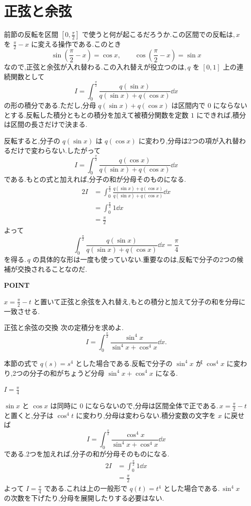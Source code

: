 \section{正弦と余弦}\label{節:正弦余弦の交換}

前節の反転を区間 $\left[0,\frac{\pi}{2}\right]$ で使うと何が起こるだろうか.この区間での反転は,\,$x$ を $\frac{\pi}{2}-x$ に変える操作である.このとき
\[
\sin\left(\frac{\pi}{2}-x\right)=\cos x,\qquad
\cos\left(\frac{\pi}{2}-x\right)=\sin x
\]
なので,正弦と余弦が入れ替わる.この入れ替えが役立つのは,\,$q$ を $[0,1]$ 上の連続関数として
\[
I=\int_0^{\frac{\pi}{2}}
\frac{q(\sin x)}{q(\sin x)+q(\cos x)}\dd x
\]
の形の積分である.ただし,分母 $q(\sin x)+q(\cos x)$ は区間内で $0$ にならないとする.反転した積分ともとの積分を加えて被積分関数を定数 $1$ にできれば,積分は区間の長さだけで決まる.

反転すると,分子の $q(\sin x)$ は $q(\cos x)$ に変わり,分母は2つの項が入れ替わるだけで変わらない.したがって
\[
I=\int_0^{\frac{\pi}{2}}
\frac{q(\cos x)}{q(\sin x)+q(\cos x)}\dd x
\]
である.もとの式と加えれば,分子の和が分母そのものになる.
\[
\begin{aligned}
2I&=\int_0^{\frac{\pi}{2}}
\frac{q(\sin x)+q(\cos x)}{q(\sin x)+q(\cos x)}\dd x\\
 &=\int_0^{\frac{\pi}{2}}1\dd x\\
 &=\frac{\pi}{2}
\end{aligned}
\]
よって
\[
\int_0^{\frac{\pi}{2}}
\frac{q(\sin x)}{q(\sin x)+q(\cos x)}\dd x
 =\frac{\pi}{4}
\]
を得る.\,$q$ の具体的な形は一度も使っていない.重要なのは,反転で分子の2つの候補が交換されることなのだ.

\begin{bookpoint}
\textbf{POINT}\par
$x=\frac{\pi}{2}-t$ と置いて正弦と余弦を入れ替え,もとの積分と加えて分子の和を分母に一致させる.
\end{bookpoint}

\begin{example}{正弦と余弦の交換}
次の定積分を求めよ.
\[
I=\int_0^{\frac{\pi}{2}}
\frac{\sin^4x}{\sin^4x+\cos^4x}\dd x.
\]
\end{example}

本節の式で $q(s)=s^4$ とした場合である.反転で分子の $\sin^4x$ が $\cos^4x$ に変わり,2つの分子の和がちょうど分母 $\sin^4x+\cos^4x$ になる.

$I=\frac{\pi}{4}$

$\sin x$ と $\cos x$ は同時に $0$ にならないので,分母は区間全体で正である.\,$x=\frac{\pi}{2}-t$ と置くと,分子は $\cos^4t$ に変わり,分母は変わらない.積分変数の文字を $x$ に戻せば
\[
I=\int_0^{\frac{\pi}{2}}
\frac{\cos^4x}{\sin^4x+\cos^4x}\dd x
\]
である.2つを加えれば,分子の和が分母そのものになる.
\[
\begin{aligned}
2I&=\int_0^{\frac{\pi}{2}}1\dd x\\
 &=\frac{\pi}{2}
\end{aligned}
\]
よって $I=\frac{\pi}{4}$ である.これは上の一般形で $q(t)=t^4$ とした場合である.\,$\sin^4x$ の次数を下げたり,分母を展開したりする必要はない.

